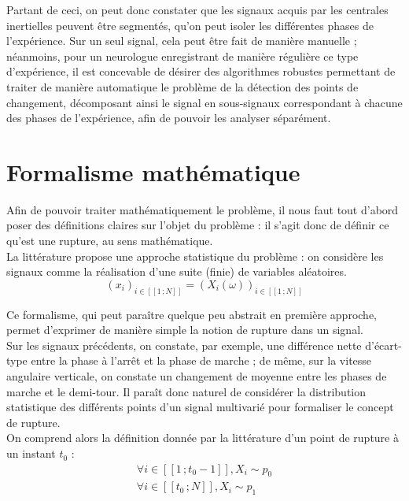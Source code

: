 \documentclass[french,11pt,notitlepage]{report}
\begin{document}
	\vspace{1pc}
	
	Partant de ceci, on peut donc constater que les signaux acquis par les centrales inertielles peuvent être segmentés,
	qu'on peut isoler les différentes phases de l'expérience.
	Sur un seul signal, cela peut être fait de manière manuelle ;
	néanmoins,
	pour un neurologue enregistrant de manière régulière ce type d'expérience,
	il est concevable de désirer des algorithmes robustes permettant de traiter de manière automatique le problème de la détection des points de changement,
	décomposant ainsi le signal en sous-signaux correspondant à chacune des phases de l'expérience, afin de pouvoir les analyser séparément.
	
	
	\section{Formalisme mathématique}
	
	
	Afin de pouvoir traiter mathématiquement le problème,
	il nous faut tout d'abord poser des définitions claires sur l'objet du problème :
	il s'agit donc de définir ce qu'est une rupture,
	au sens mathématique.
	\\
	
	La littérature propose une approche statistique du problème : 
	on considère les signaux comme la réalisation d'une suite (finie) de variables aléatoires.
	\begin{equation}
		(x_i)_{i \in [\![1\,; N]\!]} = (X_i(\omega))_{i \in [\![1\,; N]\!]}
		\label{11}
	\end{equation}
	
	Ce formalisme,
	qui peut paraître quelque peu abstrait en première approche,
	permet d'exprimer de manière simple la notion de rupture dans un signal.
	\\
	
	Sur les signaux précédents, on constate, par exemple,
	une différence nette d'écart-type entre la phase à l'arrêt et la phase de marche ;
	de même, sur la vitesse angulaire verticale, on constate un changement de moyenne entre les phases de marche et le demi-tour.
	Il paraît donc naturel de considérer la distribution statistique des différents points d'un signal multivarié pour formaliser le concept de rupture.
	\\
	
	On comprend alors la définition donnée par la littérature d'un point de rupture à un instant $t_0$ :
	\begin{equation}
	\begin{array}{ll}
			\forall i \in [\![1\,; t_0-1]\!], X_i \sim p_0 \\
			 \forall i \in [\![t_0\,; N]\!], X_i \sim p_1 \\
	\end{array}
	\end{equation}
	
\end{document}
